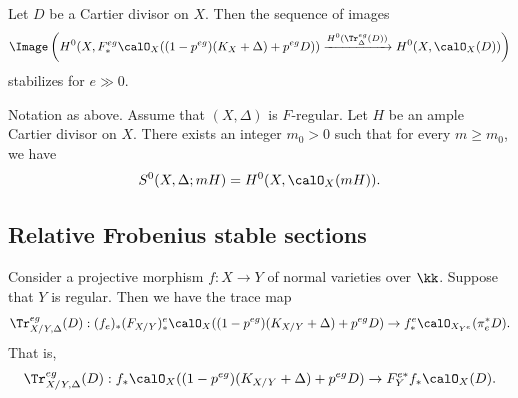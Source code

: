 \begin{proposition}
	Let $D$ be a Cartier divisor on $X$.
	Then the sequence of images
	\[ \Image\left( H^0(X, F^{eg}_* \calO_X((1-p^{eg})(K_X+\Delta)+p^{eg}D)) \xrightarrow{H^0(\Tr_\Delta^{eg}(D))} H^0(X, \calO_X(D)) \right) \]
	stabilizes for $e \gg 0$.
\end{proposition}

\begin{proposition}
	Notation as above.
	Assume that $(X,\Delta)$ is $F$-regular.
	Let $H$ be an ample Cartier divisor on $X$.
	There exists an integer $m_0>0$ such that for every $m \geq m_0$, we have
	\[ S^0(X,\Delta;mH) = H^0(X, \calO_X(mH)). \]
\end{proposition}


\subsection{Relative Frobenius stable sections}

Consider a projective morphism $f: X \to Y$ of normal varieties over $\kk$.\Yang{}
Suppose that $Y$ is regular.
Then we have the trace map
\[ \Tr_{X/Y,\Delta}^{eg}(D): (f_e)_*(F_{X/Y})^e_*\calO_{X}((1-p^{eg})(K_{X/Y}+\Delta)+p^{eg}D) \to f_*^e\calO_{X_{Y^e}}(\pi_e^*D). \]
That is,
\[ \Tr_{X/Y,\Delta}^{eg}(D): f_* \calO_{X}((1-p^{eg})(K_{X/Y}+\Delta)+p^{eg}D) \to F_Y^{e*} f_* \calO_X(D). \]
\Yang{}









